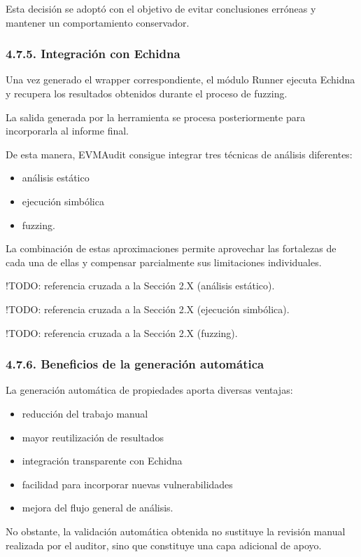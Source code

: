 Esta decisión se adoptó con el objetivo de evitar conclusiones erróneas
y mantener un comportamiento conservador.

\subsubsection{4.7.5. Integración con
Echidna}\label{integraciuxf3n-con-echidna}

Una vez generado el wrapper correspondiente, el módulo Runner ejecuta
Echidna y recupera los resultados obtenidos durante el proceso de
fuzzing.

La salida generada por la herramienta se procesa posteriormente para
incorporarla al informe final.

De esta manera, EVMAudit consigue integrar tres técnicas de análisis
diferentes:

\begin{itemize}
\tightlist
\item
  análisis estático
\item
  ejecución simbólica
\item
  fuzzing.
\end{itemize}

La combinación de estas aproximaciones permite aprovechar las fortalezas
de cada una de ellas y compensar parcialmente sus limitaciones
individuales.

!TODO: referencia cruzada a la Sección 2.X (análisis estático).

!TODO: referencia cruzada a la Sección 2.X (ejecución simbólica).

!TODO: referencia cruzada a la Sección 2.X (fuzzing).

\subsubsection{4.7.6. Beneficios de la generación
automática}\label{beneficios-de-la-generaciuxf3n-automuxe1tica}

La generación automática de propiedades aporta diversas ventajas:

\begin{itemize}
\tightlist
\item
  reducción del trabajo manual
\item
  mayor reutilización de resultados
\item
  integración transparente con Echidna
\item
  facilidad para incorporar nuevas vulnerabilidades
\item
  mejora del flujo general de análisis.
\end{itemize}

No obstante, la validación automática obtenida no sustituye la revisión
manual realizada por el auditor, sino que constituye una capa adicional
de apoyo.
